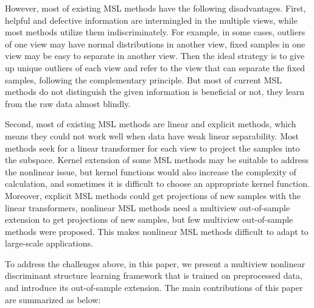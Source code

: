 \documentclass[journal]{IEEEtran}
\begin{document}
However, most of existing MSL methods have the following disadvantages. 
First, helpful and defective information are intermingled in the multiple views, while most methods utilize them indiscriminately. 
For example, in some cases, outliers of one view may have normal distributions in another view, fixed samples in one view may be easy to separate in another view. 
Then the ideal strategy is to give up unique outliers of each view and refer to the view that can separate the fixed samples, following the complementary principle. 
But most of current MSL methods do not distinguish the given information is beneficial or not, they learn from the raw data almost blindly. 

Second, most of existing MSL methods are linear and explicit methods, which means they could not work well when data have weak linear separability. 
Most methods seek for a linear transformer for each view to project the samples into the subspace. 
Kernel extension of some MSL methods may be suitable to address the nonlinear issue, but kernel functions would also increase the complexity of calculation, and sometimes it is difficult to choose an appropriate kernel function. 
Moreover, explicit MSL methods could get projections of new samples with the linear transformers, nonlinear MSL methods need a multiview out-of-sample extension to get projections of new samples, but few multiview out-of-sample methods were proposed. 
This makes nonlinear MSL methods difficult to adapt to large-scale applications. 

To address the challenges above, in this paper, we present a multiview nonlinear discriminant structure learning framework that is trained on preprocessed data, and introduce its out-of-sample extension. 
The main contributions of this paper are summarized as below: 
\end{document}

